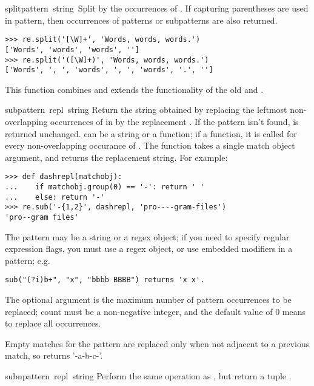 \begin{funcdesc}{split}{pattern\, string\, }
  Split  by the occurrences of .  If
  capturing parentheses are used in pattern, then occurrences of
  patterns or subpatterns are also returned.
%
\bcode\begin{verbatim}
>>> re.split('[\W]+', 'Words, words, words.')
['Words', 'words', 'words', '']
>>> re.split('([\W]+)', 'Words, words, words.')
['Words', ', ', 'words', ', ', 'words', '.', '']
\end{verbatim}\ecode
%
  This function combines and extends the functionality of
  the old  and .
\end{funcdesc}

\begin{funcdesc}{sub}{pattern\, repl\, string}
Return the string obtained by replacing the leftmost non-overlapping
occurrences of  in  by the replacement
.  If the pattern isn't found,  is returned
unchanged.   can be a string or a function; if a function,
it is called for every non-overlapping occurance of .
The function takes a single match object argument, and returns the
replacement string.  For example:
%
\bcode\begin{verbatim}
>>> def dashrepl(matchobj):
...    if matchobj.group(0) == '-': return ' '
...    else: return '-'
>>> re.sub('-{1,2}', dashrepl, 'pro----gram-files')
'pro--gram files'
\end{verbatim}\ecode
%
The pattern may be a string or a 
regex object; if you need to specify
regular expression flags, you must use a regex object, or use
embedded modifiers in a pattern; e.g.
%
\bcode\begin{verbatim}
sub("(?i)b+", "x", "bbbb BBBB") returns 'x x'.
\end{verbatim}\ecode
%
The optional argument  is the maximum number of pattern
occurrences to be replaced; count must be a non-negative integer, and
the default value of 0 means to replace all occurrences.

Empty matches for the pattern are replaced only when not adjacent to a
previous match, so  returns '-a-b-c-'.
\end{funcdesc}

\begin{funcdesc}{subn}{pattern\, repl\, string}
Perform the same operation as , but return a tuple
.
\end{funcdesc}


